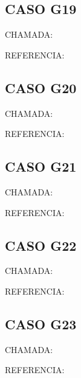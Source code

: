 \documentclass{undftex}
\begin{document}
\begin{refsection}\section*{CASO G19} CHAMADA: \par REFERENCIA:\par\printbibliography[heading=none]\end{refsection}\clearpage
\begin{refsection}\section*{CASO G20} CHAMADA: \par REFERENCIA:\par\printbibliography[heading=none]\end{refsection}\clearpage
\begin{refsection}\section*{CASO G21} CHAMADA: \par REFERENCIA:\par\printbibliography[heading=none]\end{refsection}\clearpage
\begin{refsection}\section*{CASO G22} CHAMADA: \par REFERENCIA:\par\printbibliography[heading=none]\end{refsection}\clearpage
\begin{refsection}\section*{CASO G23} CHAMADA: \par REFERENCIA:\par\printbibliography[heading=none]\end{refsection}\clearpage
\end{document}
